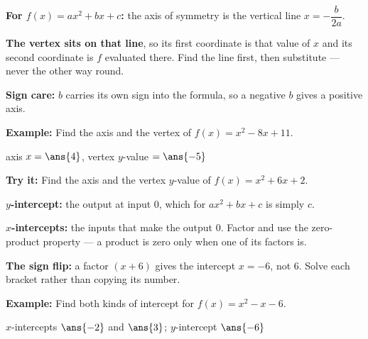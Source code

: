 \documentclass[12pt]{article}
\begin{document}


\begin{formulabox}
\textbf{For $f(x) = ax^2 + bx + c$:} the axis of symmetry is the vertical line $x = -\dfrac{b}{2a}$.\par
\textbf{The vertex sits on that line}, so its first coordinate is that value of $x$ and its second coordinate is $f$ evaluated there. Find the line first, then substitute --- never the other way round.\par
\textbf{Sign care:} $b$ carries its own sign into the formula, so a negative $b$ gives a positive axis.
\end{formulabox}

\begin{examplebox}
\textbf{Example:} \quad Find the axis and the vertex of $f(x) = x^2 - 8x + 11$.

axis $x = \ans{4}$, \quad vertex $y$-value $= \ans{-5}$
\end{examplebox}

\begin{tryitbox}
\textbf{Try it:} \quad Find the axis and the vertex $y$-value of $f(x) = x^2 + 6x + 2$.\\[2pt]
\end{tryitbox}


\begin{formulabox}
\textbf{$y$-intercept:} the output at input $0$, which for $ax^2 + bx + c$ is simply $c$.\par
\textbf{$x$-intercepts:} the inputs that make the output $0$. Factor and use the zero-product property --- a product is zero only when one of its factors is.\par
\textbf{The sign flip:} a factor $(x + 6)$ gives the intercept $x = -6$, not $6$. Solve each bracket rather than copying its number.
\end{formulabox}

\begin{examplebox}
\textbf{Example:} \quad Find both kinds of intercept for $f(x) = x^2 - x - 6$.

$x$-intercepts $\ans{-2}$ and $\ans{3}$; \quad $y$-intercept $\ans{-6}$
\end{examplebox}
\end{document}
